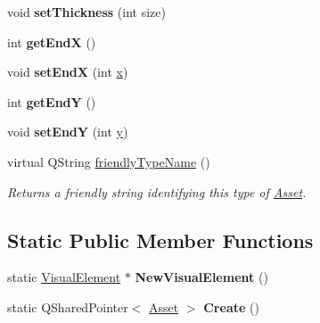 \begin{DoxyCompactItemize}
\item 
\hypertarget{class_picto_1_1_arrow_graphic_a216865b2cde07998df16df12adeb528d}{void {\bfseries set\-Thickness} (int size)}\label{class_picto_1_1_arrow_graphic_a216865b2cde07998df16df12adeb528d}

\item 
\hypertarget{class_picto_1_1_arrow_graphic_a67f483d1304d50c26750461029c3e935}{int {\bfseries get\-End\-X} ()}\label{class_picto_1_1_arrow_graphic_a67f483d1304d50c26750461029c3e935}

\item 
\hypertarget{class_picto_1_1_arrow_graphic_a20cbc3e033a7677d1329cb932fdb8adb}{void {\bfseries set\-End\-X} (int \hyperlink{struct_picto_1_1_visual_element_a1b50bc5fa41868f661687015be3c97e8}{x})}\label{class_picto_1_1_arrow_graphic_a20cbc3e033a7677d1329cb932fdb8adb}

\item 
\hypertarget{class_picto_1_1_arrow_graphic_acd5b2068d77ff486fd3df837f5c25ac9}{int {\bfseries get\-End\-Y} ()}\label{class_picto_1_1_arrow_graphic_acd5b2068d77ff486fd3df837f5c25ac9}

\item 
\hypertarget{class_picto_1_1_arrow_graphic_aaa8fa2444f5f9da879c01ec311342cef}{void {\bfseries set\-End\-Y} (int \hyperlink{struct_picto_1_1_visual_element_a9a4db3430219e1f78208eda1a89e9f38}{y})}\label{class_picto_1_1_arrow_graphic_aaa8fa2444f5f9da879c01ec311342cef}

\item 
virtual Q\-String \hyperlink{class_picto_1_1_arrow_graphic_a60ca65b25990b13a2174cc9e38c7e530}{friendly\-Type\-Name} ()
\begin{DoxyCompactList}\small\item\em Returns a friendly string identifying this type of \hyperlink{class_picto_1_1_asset}{Asset}. \end{DoxyCompactList}\end{DoxyCompactItemize}
\subsection*{Static Public Member Functions}
\begin{DoxyCompactItemize}
\item 
\hypertarget{class_picto_1_1_arrow_graphic_a0ac41c7e0d25915b12682521397e7cee}{static \hyperlink{struct_picto_1_1_visual_element}{Visual\-Element} $\ast$ {\bfseries New\-Visual\-Element} ()}\label{class_picto_1_1_arrow_graphic_a0ac41c7e0d25915b12682521397e7cee}

\item 
\hypertarget{class_picto_1_1_arrow_graphic_aafd3254a6c95e41a5caae4e99e47fec3}{static Q\-Shared\-Pointer$<$ \hyperlink{class_picto_1_1_asset}{Asset} $>$ {\bfseries Create} ()}\label{class_picto_1_1_arrow_graphic_aafd3254a6c95e41a5caae4e99e47fec3}

\end{DoxyCompactItemize}
